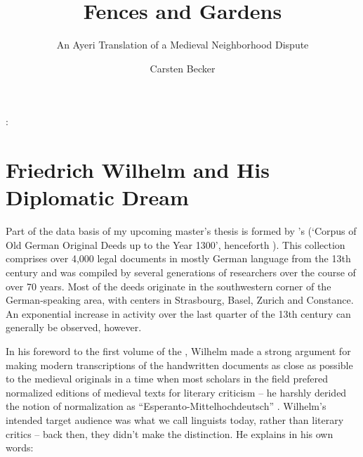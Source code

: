 \documentclass[12pt,paper=a4]{scrartcl}
\author{Carsten Becker}
\title{Fences and Gardens}
\subtitle{An Ayeri Translation of a Medieval Neighborhood Dispute}
\newenvironment{mytitle}{
    \hfill
    \begin{minipage}{0.667\textwidth}
	\vspace{\baselineskip}
	\begin{center}
	    \Large
	    \sffamily\bfseries
	    \makeatletter
}{
	    \makeatother
	\end{center}
	\vspace{1em}
    \end{minipage}
    \hfill
}
\begin{document}

\begin{mytitle}
    \@title: \@subtitle
\end{mytitle}

\section{Friedrich Wilhelm and His Diplomatic Dream}
Part of the data basis of my upcoming master's thesis is formed by 
\citeauthor{CAO}'s  (\enquote*{Corpus of Old German Original 
Deeds up to the Year 1300}, henceforth ). This collection 
comprises over 4,000 legal documents in mostly German language from the 13th 
century and was compiled by several generations of researchers over the course 
of over 70 years. Most of the deeds originate in the southwestern corner of the 
German-speaking area, with centers in Strasbourg, Basel, Zurich and Constance. 
An exponential increase in activity over the last quarter of the 13th century 
can generally be observed, however.

In his foreword to the first volume of the , Wilhelm made a 
strong argument for making modern transcriptions of the handwritten documents as 
close as possible to the medieval originals in a time when most scholars in the 
field prefered normalized editions of medieval texts for literary criticism – he 
harshly derided the notion of normalization as  
\enquote{Esperanto-Mittelhochdeutsch} \autocite[VIII--IX]{CAO1}. Wilhelm's 
intended target audience was what we call linguists today, rather than literary 
critics -- back then, they didn't make the distinction. He explains in his own 
words:
\end{document}
